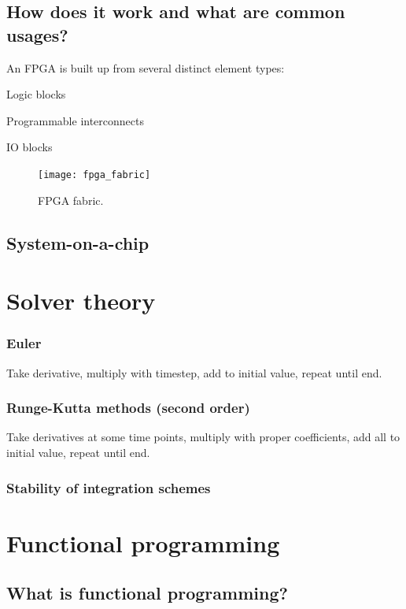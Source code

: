 \subsection{How does it work and what are common usages?}
An FPGA is built up from several distinct element types:\begin{enumeratens}
	\item Logic blocks
	\item Programmable interconnects
	\item IO blocks
\end{enumeratens}

\begin{figure}[h]
	\centering
	\texttt{[image: fpga\_fabric]}
	\caption{FPGA fabric.}
\end{figure}


\subsection{System-on-a-chip}

\section{Solver theory}
\subsubsection{Euler}
Take derivative, multiply with timestep, add to initial value, repeat until end.
\subsubsection{Runge-Kutta methods (second order)}
Take derivatives at some time points, multiply with proper coefficients, add all to initial value, repeat until end.
\subsubsection{Stability of integration schemes}


\section{Functional programming}
\subsection{What is functional programming?}

